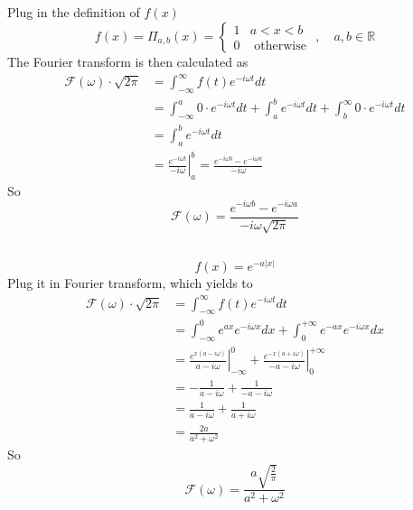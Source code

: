 \documentclass{article}
\begin{document}
\subsection{}
Plug in the definition of $f(x)$
\[
	f(x)= \Pi_{a, b}(x)=\left\{\begin{array}{ll}{1} & {a<x<b} \\ {0} & {\text { otherwise }}\end{array}\right., \quad a, b \in \mathbb{R}
\]
The Fourier transform is then calculated as 
\begin{align*}
	\mathcal{F}(\omega)\cdot \sqrt{2\pi}&=\int_{-\infty}^{\infty} f(t) e^{-i \omega t} d t \\ 
	&=\int_{-\infty}^{a} 0\cdot  e^{-i \omega t} d t +\int_{a}^{b} e^{-i \omega t} d t +\int_{b}^{\infty} 0\cdot  e^{-i \omega t} d t \\
	&= \int_{a}^{b} e^{-i \omega t} d t  \\
	&= \left. \frac{e^{-i \omega t}}{-i \omega} \right|_a^b = \frac{e^{-i \omega b}-e^{-i \omega a}}{-i \omega}
\end{align*}
So
\[
	\mathcal{F}(\omega) = \frac{e^{-i \omega b}-e^{-i \omega a}}{-i \omega \sqrt{2\pi}}
\]
\subsection{}
\[
	f(x) = e^{-a|x|}
\]
Plug it in Fourier transform, which yields to 
\begin{align*}
	\mathcal{F}(\omega)\cdot \sqrt{2\pi}&=\int_{-\infty}^{\infty} f(t) e^{-i \omega t} d t \\ 
	&= \int_{-\infty}^0 e^{ax}  e^{-i \omega x} dx + \int_0^{+\infty} e^{-ax}  e^{-i \omega x} dx \\
	&= \left.\frac{e^{x(a- i \omega)}}{a- i \omega} \right|_{-\infty}^0 + \left.\frac{e^{-x (a+ i \omega)}}{-a - i \omega} \right|_0^{+\infty} \\
	& = -\frac{1}{a- i \omega}+ \frac{1}{-a- i \omega}\\
	&= \frac{1}{a- i \omega}+ \frac{1}{a+ i \omega} \\
	&= \frac{2a}{a^2+\omega^2}
\end{align*}
So 
\[
	\mathcal{F}(\omega)=\frac{a \sqrt{\frac{2}{\pi}}}{a^{2}+\omega^{2}}
\]
\end{document}
